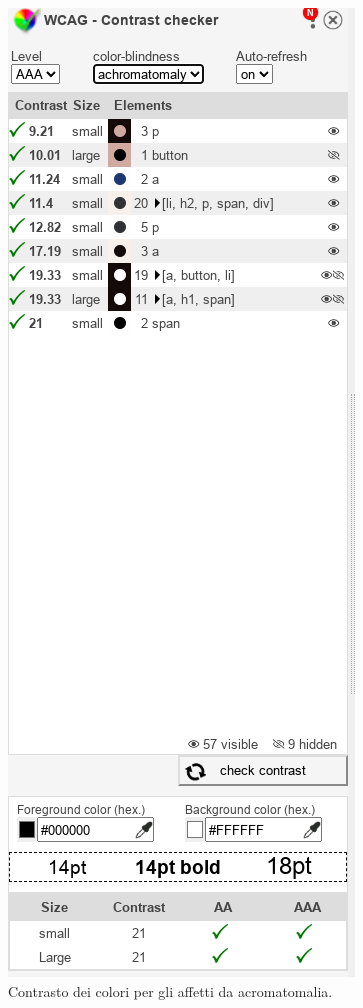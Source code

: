 \documentclass{template}
\begin{document}
	\pagebreak
	\begin{figure}[H]
		\centering
		\includegraphics[scale=0.6]{src/contrasti/achromatomaly.png}
		\caption{Contrasto dei colori per gli affetti da acromatomalia.}
	\end{figure}
	\pagebreak
\end{document}
